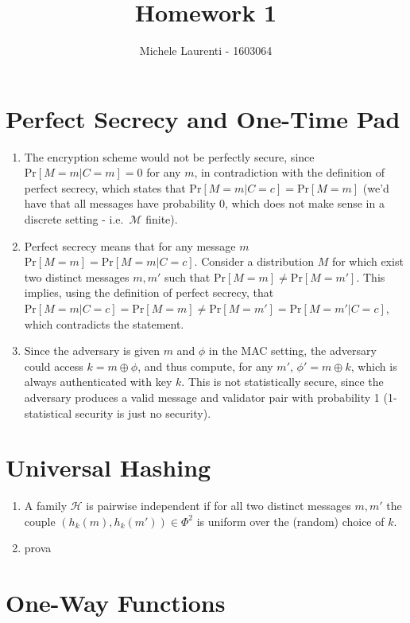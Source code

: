 \documentclass{article}
\title{Homework 1}
\author{Michele Laurenti - 1603064}
\newcommand{\messages}{\mathcal{M}}
\newcommand{\hash}{\mathcal{H}}
\newcommand{\xor}{\oplus}
\renewcommand{\Pr}[1]{\ensuremath{\mathrm{Pr} \left[ {#1} \right]}}
\begin{document}
\maketitle

\section{Perfect Secrecy and One-Time Pad}

\begin{enumerate}
	\item The encryption scheme would not be perfectly secure, since $\Pr{M=m | C=m} = 0$ for any $m$, in contradiction with the definition of perfect secrecy, which states that $\Pr{M=m|C=c}=\Pr{M=m}$ (we'd have that all messages have probability 0, which does not make sense in a discrete setting - i.e.\ $\messages$ finite).

	\item Perfect secrecy means that for any message $m$ $\Pr{M=m} = \Pr{M=m|C=c}$.
		Consider a distribution $M$ for which exist two distinct messages $m, m'$ such that $\Pr{M=m} \neq \Pr{M=m'}$.
		This implies, using the definition of perfect secrecy, that $\Pr{M=m | C=c} = \Pr{M=m} \neq \Pr{M=m'} = \Pr{M=m' | C=c}$, which contradicts the statement.

	\item Since the adversary is given $m$ and $\phi$ in the MAC setting, the adversary could access $k = m \xor \phi$, and thus compute, for any $m'$, $\phi' = m \xor k$, which is always authenticated with key $k$.
		This is not statistically secure, since the adversary produces a valid message and validator pair with probability 1 (1-statistical security is just no security).
\end{enumerate}

\section{Universal Hashing}

\begin{enumerate}
	\item A family $\hash$ is pairwise independent if for all two distinct messages $m, m'$ the couple $(h_k(m), h_k(m')) \in \Phi^2$ is uniform over the (random) choice of $k$.

	\item prova
\end{enumerate}

\section{One-Way Functions}
\end{document}
